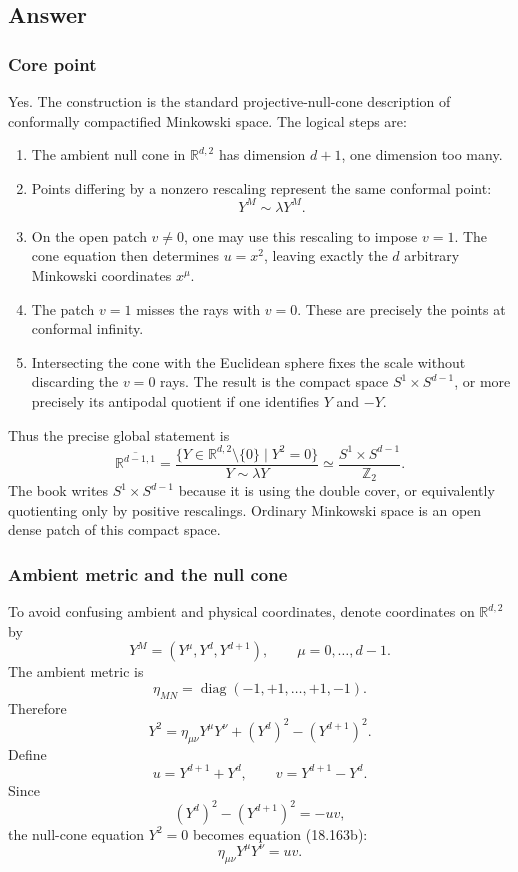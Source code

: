 \documentclass[
  10pt,
  a4paper,
  openany]{book}
\providecommand{\tightlist}{%
  \setlength{\itemsep}{0pt}\setlength{\parskip}{0pt}}
\begin{document}
\subsection{Answer}\label{answer-46}

\subsubsection{Core point}\label{core-point-46}

Yes. The construction is the standard projective-null-cone description
of conformally compactified Minkowski space. The logical steps are:

\begin{enumerate}
\def\labelenumi{\arabic{enumi}.}
\tightlist
\item
  The ambient null cone in \(\mathbb R^{d,2}\) has dimension \(d+1\),
  one dimension too many.
\item
  Points differing by a nonzero rescaling represent the same conformal
  point: \[
  Y^M\sim\lambda Y^M.
  \]
\item
  On the open patch \(v\neq0\), one may use this rescaling to impose
  \(v=1\). The cone equation then determines \(u=x^2\), leaving exactly
  the \(d\) arbitrary Minkowski coordinates \(x^\mu\).
\item
  The patch \(v=1\) misses the rays with \(v=0\). These are precisely
  the points at conformal infinity.
\item
  Intersecting the cone with the Euclidean sphere fixes the scale
  without discarding the \(v=0\) rays. The result is the compact space
  \(S^1\times S^{d-1}\), or more precisely its antipodal quotient if one
  identifies \(Y\) and \(-Y\).
\end{enumerate}

Thus the precise global statement is \[
\boxed{
\overline{\mathbb R^{d-1,1}}
=
\frac{\{Y\in\mathbb R^{d,2}\setminus\{0\}\mid Y^2=0\}}
{Y\sim\lambda Y}
\simeq
\frac{S^1\times S^{d-1}}{\mathbb Z_2}
}.
\] The book writes \(S^1\times S^{d-1}\) because it is using the double
cover, or equivalently quotienting only by positive rescalings. Ordinary
Minkowski space is an open dense patch of this compact space.

\subsubsection{Ambient metric and the null
cone}\label{ambient-metric-and-the-null-cone}

To avoid confusing ambient and physical coordinates, denote coordinates
on \(\mathbb R^{d,2}\) by \[
Y^M
=
\left(
Y^\mu,Y^d,Y^{d+1}
\right),
\qquad
\mu=0,\ldots,d-1.
\] The ambient metric is \[
\eta_{MN}
=\operatorname{diag}
\left(
-1,+1,\ldots,+1,-1
\right).
\] Therefore \[
Y^2
=
\eta_{\mu\nu}Y^\mu Y^\nu
+(Y^d)^2-(Y^{d+1})^2.
\] Define \[
u=Y^{d+1}+Y^d,
\qquad
v=Y^{d+1}-Y^d.
\] Since \[
(Y^d)^2-(Y^{d+1})^2=-uv,
\] the null-cone equation \(Y^2=0\) becomes equation (18.163b): \[
\boxed{
\eta_{\mu\nu}Y^\mu Y^\nu=uv
}.
\]
\end{document}
